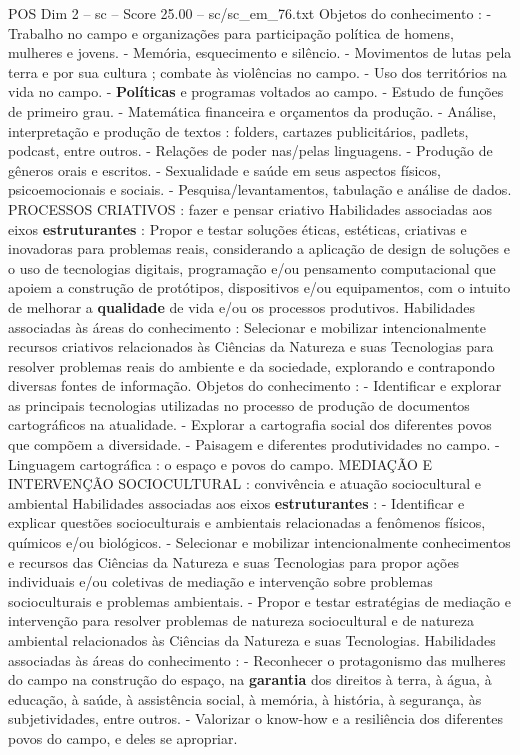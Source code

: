 \begin{textsample}{POS Dim 2 – sc – Score 25.00 – sc/sc\_em\_76.txt}
Objetos do conhecimento : - Trabalho no campo e organizações para participação política de homens, mulheres e jovens. - Memória, esquecimento e silêncio. - Movimentos de lutas pela terra e por sua cultura ; combate às violências no campo. - Uso dos territórios na vida no campo. - \textbf{Políticas} e programas voltados ao campo. - Estudo de funções de primeiro grau. - Matemática financeira e orçamentos da produção. - Análise, interpretação e produção de textos : folders, cartazes publicitários, padlets, podcast, entre outros. - Relações de poder nas/pelas linguagens. - Produção de gêneros orais e escritos. - Sexualidade e saúde em seus aspectos físicos, psicoemocionais e sociais. - Pesquisa/levantamentos, tabulação e análise de dados.
PROCESSOS CRIATIVOS : fazer e pensar criativo Habilidades associadas aos eixos \textbf{estruturantes} : Propor e testar soluções éticas, estéticas, criativas e inovadoras para problemas reais, considerando a aplicação de design de soluções e o uso de tecnologias digitais, programação e/ou pensamento computacional que apoiem a construção de protótipos, dispositivos e/ou equipamentos, com o intuito de melhorar a \textbf{qualidade} de vida e/ou os processos produtivos.
Habilidades associadas às áreas do conhecimento : Selecionar e mobilizar intencionalmente recursos criativos relacionados às Ciências da Natureza e suas Tecnologias para resolver problemas reais do ambiente e da sociedade, explorando e contrapondo diversas fontes de informação.
Objetos do conhecimento : - Identificar e explorar as principais tecnologias utilizadas no processo de produção de documentos cartográficos na atualidade. - Explorar a cartografia social dos diferentes povos que compõem a diversidade. - Paisagem e diferentes produtividades no campo. - Linguagem cartográfica : o espaço e povos do campo.
MEDIAÇÃO E INTERVENÇÃO SOCIOCULTURAL : convivência e atuação sociocultural e ambiental Habilidades associadas aos eixos \textbf{estruturantes} : - Identificar e explicar questões socioculturais e ambientais relacionadas a fenômenos físicos, químicos e/ou biológicos. - Selecionar e mobilizar intencionalmente conhecimentos e recursos das Ciências da Natureza e suas Tecnologias para propor ações individuais e/ou coletivas de mediação e intervenção sobre problemas socioculturais e problemas ambientais. - Propor e testar estratégias de mediação e intervenção para resolver problemas de natureza sociocultural e de natureza ambiental relacionados às Ciências da Natureza e suas Tecnologias.
Habilidades associadas às áreas do conhecimento : - Reconhecer o protagonismo das mulheres do campo na construção do espaço, na \textbf{garantia} dos direitos à terra, à água, à educação, à saúde, à assistência social, à memória, à história, à segurança, às subjetividades, entre outros. - Valorizar o know-how e a resiliência dos diferentes povos do campo, e deles se apropriar.

\end{textsample}
